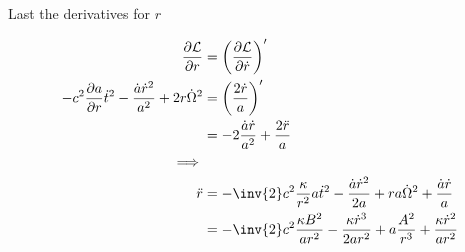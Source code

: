\documentclass{article}      %
\newcommand{\LL}[0]{\mathcal{L}}
\newcommand{\PD}[2]{\frac{\partial {#2}}{\partial {#1}}}
\newcommand{\dotOmega}[0]{\dot{\Omega}}
\newcommand{\CC}[0]{c^2}
\newcommand{\adot}[0]{\dot{a}}
\newcommand{\tdot}[0]{\dot{t}}
\newcommand{\rdot}[0]{\dot{r}}
\newcommand{\rddot}[0]{\ddot{r}}
\begin{document}
Last the derivatives for $r$

\begin{align*}
\PD{r}{\LL} &= \left(\PD{\rdot}{\LL}\right)' \\
-\CC \PD{r}{a} \tdot^2 - \frac{\adot \rdot^2}{a^2} + 2 r \dotOmega^2 
&= \left(\frac{2 \rdot}{a}\right)' \\
&= -2 \frac{ \adot \rdot }{a^2} + \frac{2 \rddot}{a} \\ 
\implies \\
{\rddot} 
&= - \inv{2} \CC \frac{\kappa}{r^2} a \tdot^2 -  \frac{\adot \rdot^2}{2 a} + r a \dotOmega^2 + \frac{ \adot \rdot }{a} \\
&= - \inv{2} \CC \frac{\kappa B^2}{a r^2} -  \frac{\kappa \rdot^3}{2 a r^2} + a \frac{A^2}{r^3} + \frac{ \kappa \rdot^2 }{a r^2} \\
\end{align*}

\end{document}
